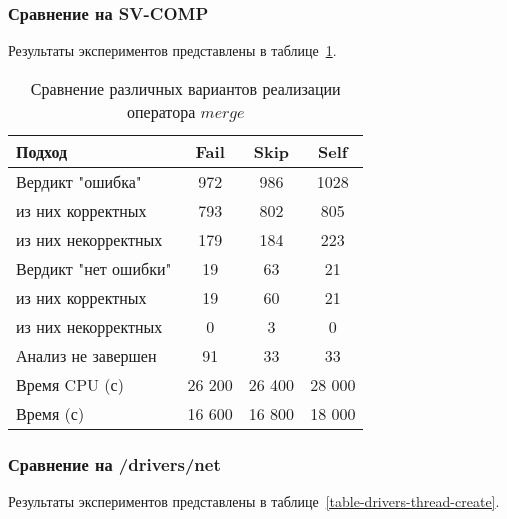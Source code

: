 \subsubsection{Сравнение на SV-COMP}
Результаты экспериментов представлены в таблице~\ref{table-svcomp-thread-create}.

\begin{center}
  \begin{table}[h]\footnotesize
  	\label{table-svcomp-thread-create}
    \caption{Сравнение различных вариантов реализации оператора $merge$}
    \begin{tabular}{ | l | c | c | c |}
      \hline
      Подход         				& Fail 	& Skip 	& Self  	\\ \hline
      Вердикт "ошибка" 				& 972   & 986   & 1028       \\ 
  \hspace{0.5cm} из них корректных 	& 793 	& 802 	& 805    	\\ 
  \hspace{0.5cm} из них некорректных & 179 	& 184 	& 223     	\\ \hline
      Вердикт "нет ошибки"  		& 19    & 63    & 21       	\\ 
  \hspace{0.5cm} из них корректных 	& 19 	& 60    & 21      	\\
  \hspace{0.5cm} из них некорректных & 0 	& 3    	& 0     	\\ \hline
      Анализ не завершен       		& 91    & 33    & 33    	\\ \hline
      Время CPU (с)   				& 26 200 & 26 400 & 28 000  \\ 
      Время (с)  					& 16 600 & 16 800 & 18 000  \\
      \hline
    \end{tabular}
  \end{table}
\end{center}

\subsubsection{Сравнение на /drivers/net}
Результаты экспериментов представлены в таблице~\ref{table-drivers-thread-create}.

